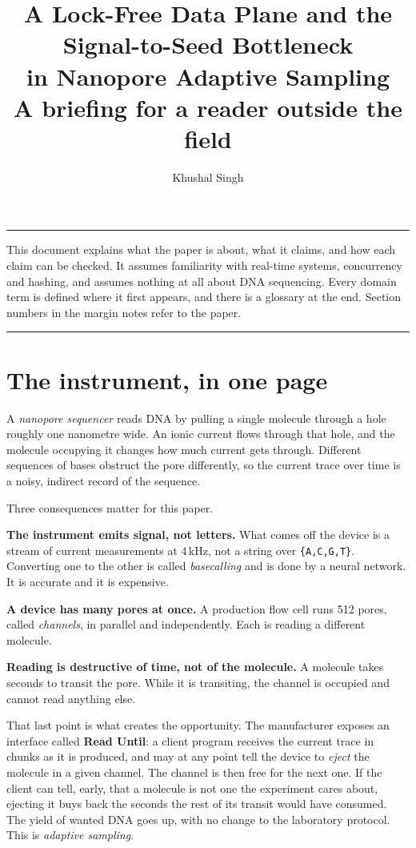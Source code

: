\documentclass[11pt,a4paper]{article}
\title{\vspace{-1.2cm}A Lock-Free Data Plane and the Signal-to-Seed Bottleneck\\
in Nanopore Adaptive Sampling\\[4pt]
\large A briefing for a reader outside the field}
\author{Khushal Singh}
\date{}
\begin{document}
\maketitle
\vspace{-0.8cm}

\noindent\rule{\textwidth}{0.4pt}

This document explains what the paper is about, what it claims, and how each claim can be
checked. It assumes familiarity with real-time systems, concurrency and hashing, and assumes
nothing at all about DNA sequencing. Every domain term is defined where it first appears, and
there is a glossary at the end. Section numbers in the margin notes refer to the paper.

\noindent\rule{\textwidth}{0.4pt}

\section{The instrument, in one page}

A \emph{nanopore sequencer} reads DNA by pulling a single molecule through a hole roughly one
nanometre wide. An ionic current flows through that hole, and the molecule occupying it
changes how much current gets through. Different sequences of bases obstruct the pore
differently, so the current trace over time is a noisy, indirect record of the sequence.

Three consequences matter for this paper.

\textbf{The instrument emits signal, not letters.} What comes off the device is a stream of
current measurements at 4\,kHz, not a string over \texttt{\{A,C,G,T\}}. Converting one to the
other is called \emph{basecalling} and is done by a neural network. It is accurate and it is
expensive.

\textbf{A device has many pores at once.} A production flow cell runs 512 pores, called
\emph{channels}, in parallel and independently. Each is reading a different molecule.

\textbf{Reading is destructive of time, not of the molecule.} A molecule takes seconds to
transit the pore. While it is transiting, the channel is occupied and cannot read anything
else.

That last point is what creates the opportunity. The manufacturer exposes an interface called
\textbf{Read Until}: a client program receives the current trace in chunks as it is produced,
and may at any point tell the device to \emph{eject} the molecule in a given channel. The
channel is then free for the next one. If the client can tell, early, that a molecule is not
one the experiment cares about, ejecting it buys back the seconds the rest of its transit
would have consumed. The yield of wanted DNA goes up, with no change to the laboratory
protocol. This is \emph{adaptive sampling}.
\end{document}
